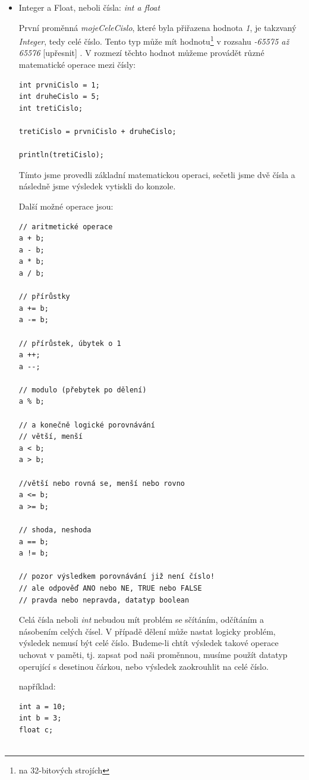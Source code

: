 \documentclass[11pt]{book}
\begin{document}
\begin{itemize}


\item{Integer a Float, neboli čísla: {\em int a float}}

První proměnná {\em mojeCeleCislo}, které byla přiřazena hodnota {\em 1}, je takzvaný {\em Integer}, tedy celé číslo. Tento typ může mít hodnotu\footnote{na 32-bitových strojích} v rozsahu {\em -65575 až 65576} [upřesnit] . V rozmezí těchto hodnot můžeme provádět různé matematické operace mezi čísly:

\begin{lstlisting}
int prvniCislo = 1;
int druheCislo = 5;
int tretiCislo;

tretiCislo = prvniCislo + druheCislo;

println(tretiCislo);
\end{lstlisting}

Tímto jsme provedli základní matematickou operaci, sečetli jsme dvě čísla a následně jsme výsledek vytiskli do konzole.

Další možné operace jsou:

\begin{lstlisting}
// aritmetické operace
a + b;
a - b;
a * b;
a / b;

// přírůstky
a += b;
a -= b;

// přírůstek, úbytek o 1
a ++;
a --;

// modulo (přebytek po dělení)
a % b;

// a konečně logické porovnávání
// větší, menší
a < b;
a > b;

//větší nebo rovná se, menší nebo rovno
a <= b;
a >= b;

// shoda, neshoda
a == b;
a != b;

// pozor výsledkem porovnávání již není číslo!
// ale odpověď ANO nebo NE, TRUE nebo FALSE
// pravda nebo nepravda, datatyp boolean

\end{lstlisting}

Celá čísla neboli {\em int} nebudou mít problém se sčítáním, odčítáním a násobením celých čísel. V případě dělení může nastat logicky problém, výsledek nemusí být celé číslo. Budeme-li chtít výsledek takové operace uchovat v paměti, tj. zapsat pod naši proměnnou, musíme použít datatyp operující s desetinou čárkou, nebo výsledek zaokrouhlit na celé číslo.

například:

\begin{lstlisting}
int a = 10;
int b = 3;
float c;


\end{lstlisting}
\end{itemize}
\end{document}
